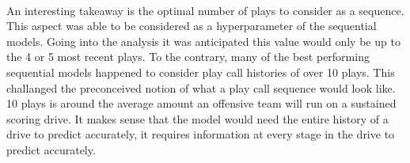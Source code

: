 \documentclass[11pt]{article}
\begin{document}
\begin{multicols*}{2}
        \paragraph{}
            An interesting takeaway is the optimal number of plays to consider as a sequence. 
            This aspect was able to be considered as a hyperparameter of the sequential models. 
            Going into the analysis it was anticipated this value would only be up to the 4 or 5 most recent plays.
            To the contrary, many of the best performing sequential models happened to consider play call histories of over 10 plays. 
            This challanged the preconceived notion of what a play call sequence would look like. 
            10 plays is around the average amount an offensive team will run on a sustained scoring drive. 
            It makes sense that the model would need the entire history of a drive to predict accurately, it requires information at every stage in the drive to predict accurately. 


\end{multicols*}
\end{document}
